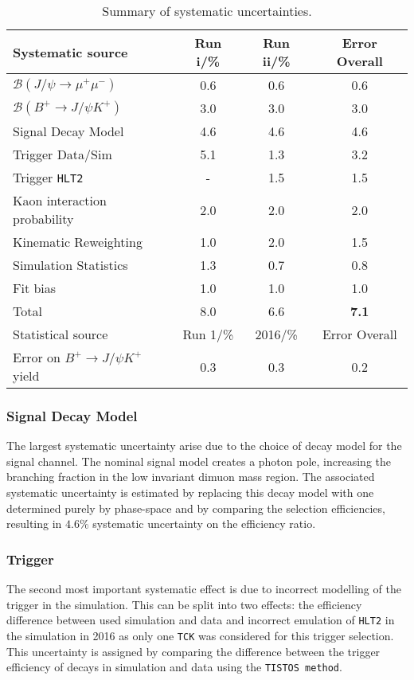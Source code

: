 \begin{table}[H]
\centering
\begin{tabular}{ l  c  c  c  }
\toprule
Systematic source & Run \Rn{1}/\% &  Run \Rn{2}/\% & Error Overall \\ \hline

$\mathcal{B}(J/\psi \rightarrow \mu^{+} \mu^{-})$ & 0.6 & 0.6 & 0.6\\
$\mathcal{B}(B^{+} \rightarrow  J/\psi K^{+})$ & 3.0 & 3.0 & 3.0\\
\hline
Signal Decay Model & 4.6 & 4.6 & 4.6\\
Trigger Data/Sim & 5.1 & 1.3& 3.2\\
Trigger \texttt{HLT2} &  -  &  1.5& 1.5\\
Kaon interaction probability &  2.0  &  2.0& 2.0\\
Kinematic Reweighting & 1.0 & 2.0 &1.5\\
Simulation Statistics & 1.3 & 0.7 & 0.8 \\
Fit bias & 1.0 & 1.0 & 1.0  \\
 \hline
 Total & 8.0 & 6.6 & \textbf{7.1} \\
 \hline
Statistical source & Run 1/\% & 2016/\% & Error Overall \\ \hline
Error on $B^{+} \rightarrow J/\psi K^{+}$ yield & 0.3 & 0.3 & 0.2\\
 \bottomrule
\end{tabular}
\caption{Summary of systematic uncertainties.}
\label{tab:systematicsummary}
\end{table}




\subsubsection{Signal Decay Model}
The largest systematic uncertainty arise due to the choice of decay model for the signal channel.
The nominal signal model creates a photon pole, increasing the branching fraction in the low invariant dimuon mass region.
The associated systematic uncertainty is estimated by replacing this decay model with one determined purely by phase-space and by comparing the selection efficiencies, resulting in $4.6\%$ systematic uncertainty on the efficiency ratio. %

\subsubsection{Trigger}
The second most important systematic effect is due to incorrect modelling of the trigger in the simulation. This can be split into two effects:
 the efficiency difference between used simulation and data and incorrect emulation of \texttt{HLT2} in the simulation in 2016 as only one \texttt{TCK} was considered for this trigger selection. This uncertainty is assigned by comparing the difference between the trigger efficiency of \bjpsimumuk decays in simulation and data using the \texttt{TISTOS method}.

